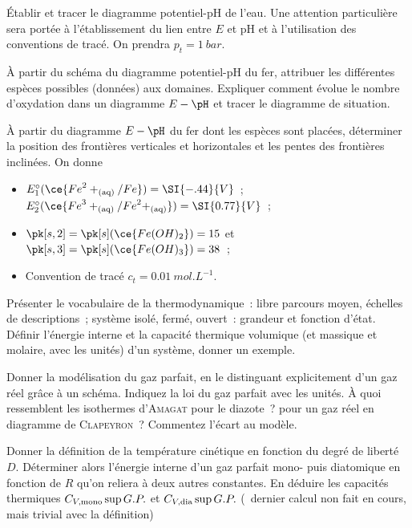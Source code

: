 \documentclass[a4paper, 11pt, final, garamond]{book}
\begin{document}
\begin{enumerate}[label=\sqenumi]
	\litem{23pt}{\strr}%
	Établir et tracer le diagramme potentiel-pH de l'eau. Une attention
	particulière sera portée à l'établissement du lien entre $E$ et pH et à
	l'utilisation des conventions de tracé. On prendra $p_t = \SI{1}{bar}$.

	\litem{23pt}{\strr}%
	À partir du schéma du diagramme potentiel-pH du fer, attribuer les
	différentes espèces possibles (données) aux domaines. Expliquer comment
	évolue le nombre d'oxydation dans un diagramme $E-\pH$ et tracer le
	diagramme de situation.

	\litem{23pt}{\strrr}%
	À partir du diagramme $E-\pH$ du fer dont les espèces sont placées,
	déterminer la position des frontières verticales et horizontales et les
	pentes des frontières inclinées. On donne
	\begin{itemize}
		\item $E_1^\circ(\ce{{Fe}^2+_{\rm(aq)}/Fe}) = \SI{-.44}{V}$~;
		      $E_2^\circ(\ce{{Fe}^3+_{\rm(aq)}/{Fe}^2+_{\rm(aq)}}) = \SI{0.77}{V}$~;
		\item $\pk[s,2] = \pk[s](\ce{Fe(OH)_2}) = 15$ et $\pk[s,3] =
			      \pk[s](\ce{Fe(OH)_3}) = 38$~;
		\item Convention de tracé $c_t = \SI{0.01}{mol.L^{-1}}$.
	\end{itemize}

	\litem{23pt}{\str}%
	Présenter le vocabulaire de la thermodynamique~: libre parcours moyen,
	échelles de descriptions~; système isolé, fermé, ouvert~: grandeur et
	fonction d'état. Définir l'énergie interne et la capacité thermique
	volumique (et massique et molaire, avec les unités) d'un système, donner un
	exemple.

	\litem{23pt}{\str}%
	Donner la modélisation du gaz parfait, en le distinguant
	explicitement d'un gaz réel grâce à un schéma. Indiquez la loi du gaz
	parfait avec les unités. À quoi ressemblent les isothermes d'\textsc{Amagat}
	pour le diazote~? pour un gaz réel en diagramme de \textsc{Clapeyron}~?
	Commentez l'écart au modèle.

	\litem{23pt}{\strr}%
	Donner la définition de la température cinétique en
	fonction du degré de liberté $D$. Déterminer alors l'énergie interne d'un
	gaz parfait mono- puis diatomique en fonction de $R$ qu'on reliera à deux
	autres constantes. En déduire les capacités thermiques $C_{V,\rm
				mono}\sup{G.P.}$ et $C_{V,\rm dia}\sup{G.P.}$ (\iconimpo~dernier calcul
	non fait en cours, mais trivial avec la définition)
\end{enumerate}
\end{document}
